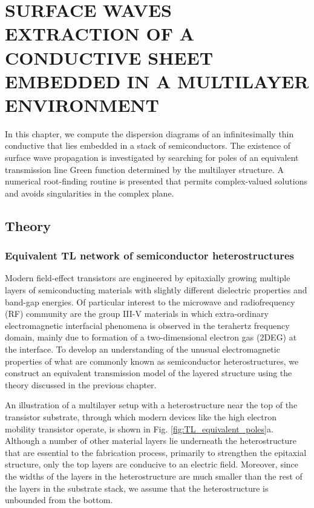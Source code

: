 \chapter{\uppercase{Surface waves extraction of a conductive sheet embedded in a multilayer environment}}

In this chapter, we compute the dispersion diagrams of an infinitesimally thin conductive that lies embedded in a stack of semiconductors. The existence of surface wave propagation is investigated by searching for poles of an equivalent transmission line Green function determined by the multilayer structure. A numerical root-finding routine is presented that permits complex-valued solutions and avoids singularities in the complex plane.

\section{Theory}
\subsection{Equivalent TL network of semiconductor heterostructures}
%
Modern field-effect transistors are engineered by epitaxially growing multiple layers of semiconducting materials with slightly different dielectric properties and band-gap energies. Of particular interest to the microwave and radiofrequency (RF) community are the group III-V materials in which extra-ordinary electromagnetic interfacial phenomena is observed in the terahertz frequency domain, mainly due to formation of a two-dimensional electron gas (2DEG) at the interface. To develop an understanding of the unusual electromagnetic properties of what are commonly known as semiconductor heterostructures, we construct an equivalent transmission model of the layered structure using the theory discussed in the previous chapter.

An illustration of a multilayer setup with a heterostructure near the top of the transistor substrate, through which modern devices like the high electron mobility transistor operate, is shown in Fig. \ref{fig:TL_equivalent_poles}a. Although a number of other material layers lie underneath the heterostructure that are essential to the fabrication process, primarily to strengthen the epitaxial structure, only the top layers are conducive to an electric field. Moreover, since the widths of the layers in the heterostructure are much smaller than the rest of the layers in the substrate stack, we assume that the heterostructure is unbounded from the bottom.

